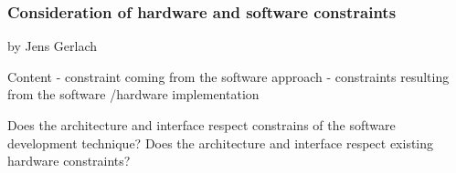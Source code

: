 \subsubsection{Consideration of hardware and software constraints}

by Jens Gerlach

Content
- constraint coming from the software approach
- constraints resulting from the software /hardware implementation

Does the architecture and interface respect constrains of the software development technique?
Does the architecture and interface respect existing hardware constraints?